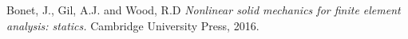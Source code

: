 \documentclass[a4paper]{article}
\begin{document}
\begin{thebibliography}{9}
     \label{Bonet}
    Bonet, J., Gil, A.J. and Wood, R.D \textit{Nonlinear solid mechanics
    for finite element analysis: statics.} Cambridge University Press, 2016.
\end{thebibliography}
\end{document}
